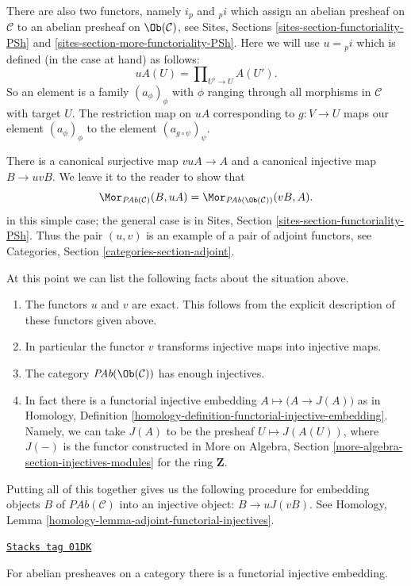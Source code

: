 \medskip\noindent
There are also two functors, namely $i_p$ and ${}_pi$
which assign an abelian presheaf on $\mathcal{C}$
to an abelian presheaf on $\Ob(\mathcal{C})$, see
Sites, Sections \ref{sites-section-functoriality-PSh} and
\ref{sites-section-more-functoriality-PSh}.
Here we will use $u = {}_pi$ which is defined (in the case at hand)
as follows:
$$
uA(U) = \prod\nolimits_{U' \to U} A(U').
$$
So an element is a family $(a_\phi)_\phi$ with $\phi$
ranging through all morphisms in $\mathcal{C}$ with target $U$.
The restriction map on $uA$ corresponding to $g : V \to U$
maps our element $(a_\phi)_\phi$ to the element
$(a_{g \circ \psi})_\psi$.

\medskip\noindent
There is a canonical surjective map $vuA \to A$ and a canonical
injective map $B \to uvB$. We leave it to the reader to show that
$$
\Mor_{\textit{PAb}(\mathcal{C})}(B, uA)
=
\Mor_{\textit{PAb}(\Ob(\mathcal{C}))}(vB, A).
$$
in this simple case; the general case is in
Sites, Section \ref{sites-section-functoriality-PSh}.
Thus the pair $(u, v)$ is an example of a pair of adjoint
functors, see
Categories, Section \ref{categories-section-adjoint}.

\medskip\noindent
At this point we can list the following facts
about the situation above.
\begin{enumerate}
\item The functors $u$ and $v$ are exact. This follows from
the explicit description of these functors given above.
\item In particular the functor $v$ transforms injective maps
into injective maps.
\item The category $\textit{PAb}(\Ob(\mathcal{C}))$
has enough injectives.
\item In fact there is a functorial injective embedding
$A \mapsto \big(A \to J(A)\big)$ as in
Homology, Definition \ref{homology-definition-functorial-injective-embedding}.
Namely, we can take $J(A)$ to be the
presheaf $U\mapsto J(A(U))$, where
$J(-)$ is the functor constructed in
More on Algebra, Section \ref{more-algebra-section-injectives-modules}
for the ring $\mathbf{Z}$.
\end{enumerate}
Putting all of this together gives us the following procedure
for embedding objects $B$ of $\textit{PAb}(\mathcal{C})$ into
an injective object: $B \to uJ(vB)$. See
Homology, Lemma \ref{homology-lemma-adjoint-functorial-injectives}.

\begin{proposition}
\label{injectives-proposition-presheaves-injectives}
\href{https://stacks.math.columbia.edu/tag/01DK}{\texttt{Stacks tag 01DK}}

For abelian presheaves on a category there is a functorial injective
embedding.
\end{proposition}

